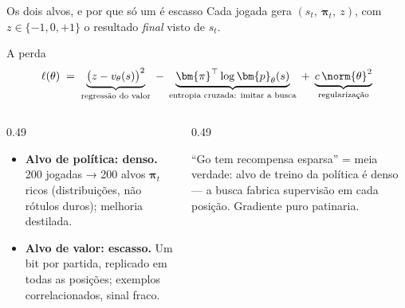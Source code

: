 \documentclass[aspectratio=169, 10pt]{beamer}
\newcommand{\redeval}{v_{\theta}}
\newcommand{\redepol}{\bm{p}_{\theta}}
\newcommand{\raizpol}{\bm{\pi}}
\begin{document}
\begin{frame}{Os dois alvos, e por que só um é escasso}
  \small
  Cada jogada gera $(s_t,\ \raizpol_t,\ z)$, com $z \in \{-1,0,+1\}$ o resultado \emph{final} visto de $s_t$.

  \begin{teobox}{A perda}
    \[
      \ell(\theta) \;=\;
      \underbrace{\bigl(z - \redeval(s)\bigr)^{2}}_{\text{regressão do valor}}
      \;-\; \underbrace{\raizpol^{\top} \log \redepol(s)}_{\text{entropia cruzada: imitar a busca}}
      \;+\; \underbrace{c\,\norm{\theta}^{2}}_{\text{regularização}}
    \]
  \end{teobox}

  \begin{columns}[T]
    \begin{column}{0.49\textwidth}
      \begin{itemize}
        \item \textbf{Alvo de política: denso.} 200 jogadas → 200 alvos $\raizpol_t$ ricos (distribuições, não rótulos duros); melhoria destilada.
        \item \textbf{Alvo de valor: escasso.} Um bit por partida, replicado em todas as posições; exemplos correlacionados, sinal fraco.
      \end{itemize}
    \end{column}
    \begin{column}{0.49\textwidth}
      \begin{alertabox}
        ``Go tem recompensa esparsa'' = meia verdade: alvo de treino da política é denso — a busca fabrica supervisão em cada posição. Gradiente puro patinaria.
      \end{alertabox}
    \end{column}
  \end{columns}
\end{frame}
\end{document}
